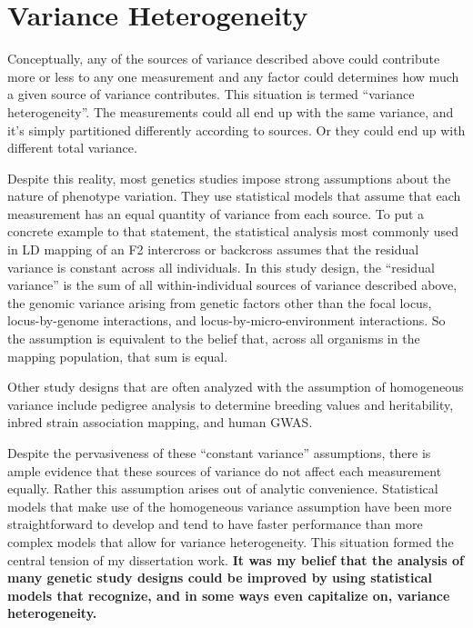 \section{Variance Heterogeneity}

Conceptually, any of the sources of variance described above could contribute more or less to any one measurement and any factor could determines how much a given source of variance contributes.
This situation is termed ``variance heterogeneity''.
The measurements could all end up with the same variance, and it's simply partitioned differently according to sources.
Or they could end up with different total variance.

Despite this reality, most genetics studies impose strong assumptions about the nature of phenotype variation.
They use statistical models that assume that each measurement has an equal quantity of variance from each source.
To put a concrete example to that statement, the statistical analysis most commonly used in LD mapping of an F2 intercross or backcross assumes that the residual variance is constant across all individuals.
In this study design, the ``residual variance'' is the sum of all within-individual sources of variance described above, the genomic variance arising from genetic factors other than the focal locus, locus-by-genome interactions, and locus-by-micro-environment interactions.
So the assumption is equivalent to the belief that, across all organisms in the mapping population, that sum is equal.

Other study designs that are often analyzed with the assumption of homogeneous variance include pedigree analysis to determine breeding values and heritability, inbred strain association mapping, and human GWAS.

Despite the pervasiveness of these ``constant variance'' assumptions, there is ample evidence that these sources of variance do not affect each measurement equally.
Rather this assumption arises out of analytic convenience.
Statistical models that make use of the homogeneous variance assumption have been more straightforward to develop and tend to have faster performance than more complex models that allow for variance heterogeneity.
This situation formed the central tension of my dissertation work.
\textbf{It was my belief that the analysis of many genetic study designs could be improved by using statistical models that recognize, and in some ways even capitalize on, variance heterogeneity.}

